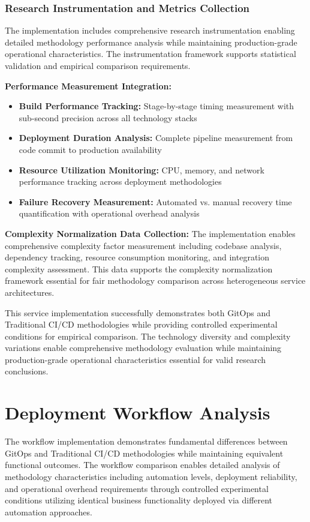 \subsubsection{Research Instrumentation and Metrics Collection}

The implementation includes comprehensive research instrumentation enabling detailed methodology performance analysis while maintaining production-grade operational characteristics. The instrumentation framework supports statistical validation and empirical comparison requirements.

\textbf{Performance Measurement Integration:}
\begin{itemize}
\item \textbf{Build Performance Tracking:} Stage-by-stage timing measurement with sub-second precision across all technology stacks
\item \textbf{Deployment Duration Analysis:} Complete pipeline measurement from code commit to production availability
\item \textbf{Resource Utilization Monitoring:} CPU, memory, and network performance tracking across deployment methodologies
\item \textbf{Failure Recovery Measurement:} Automated vs. manual recovery time quantification with operational overhead analysis
\end{itemize}

\textbf{Complexity Normalization Data Collection:}
The implementation enables comprehensive complexity factor measurement including codebase analysis, dependency tracking, resource consumption monitoring, and integration complexity assessment. This data supports the complexity normalization framework essential for fair methodology comparison across heterogeneous service architectures.



This service implementation successfully demonstrates both GitOps and Traditional CI/CD methodologies while providing controlled experimental conditions for empirical comparison. The technology diversity and complexity variations enable comprehensive methodology evaluation while maintaining production-grade operational characteristics essential for valid research conclusions.

\section{Deployment Workflow Analysis}

The workflow implementation demonstrates fundamental differences between GitOps and Traditional CI/CD methodologies while maintaining equivalent functional outcomes. The workflow comparison enables detailed analysis of methodology characteristics including automation levels, deployment reliability, and operational overhead requirements through controlled experimental conditions utilizing identical business functionality deployed via different automation approaches.

